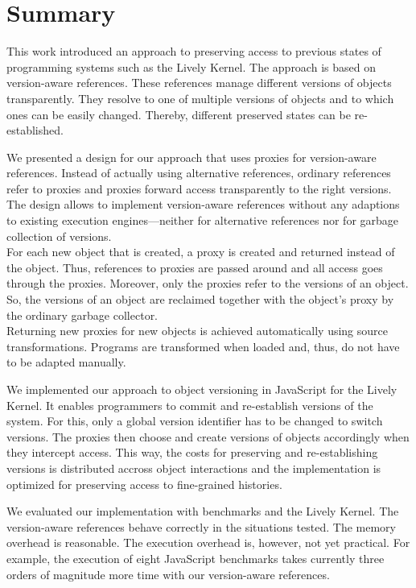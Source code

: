 \chapter{Summary} \label{chapter:SUMMARY}

This work introduced an approach to preserving access to previous states of programming systems such as the Lively Kernel.
The approach is based on version-aware references.
These references manage different versions of objects transparently.
They resolve to one of multiple versions of objects and to which ones can be easily changed.
Thereby, different preserved states can be re-established.

We presented a design for our approach that uses proxies for version-aware references.
Instead of actually using alternative references, ordinary references refer to proxies and proxies forward access transparently to the right versions.
The design allows to implement version-aware references without any adaptions to existing execution engines---neither for alternative references nor for garbage collection of versions.\\
For each new object that is created, a proxy is created and returned instead of the object.
Thus, references to proxies are passed around and all access goes through the proxies.
Moreover, only the proxies refer to the versions of an object.
So, the versions of an object are reclaimed together with the object's proxy by the ordinary garbage collector.\\
Returning new proxies for new objects is achieved automatically using source transformations.
Programs are transformed when loaded and, thus, do not have to be adapted manually.

We implemented our approach to object versioning in JavaScript for the Lively Kernel.
It enables programmers to commit and re-establish versions of the system.
For this, only a global version identifier has to be changed to switch versions.
The proxies then choose and create versions of objects accordingly when they intercept access.
This way, the costs for preserving and re-establishing versions is distributed accross object interactions and the implementation is optimized for preserving access to fine-grained histories.

We evaluated our implementation with benchmarks and the Lively Kernel.
The version-aware references behave correctly in the situations tested.
The memory overhead is reasonable.
The execution overhead is, however, not yet practical.
For example, the execution of eight JavaScript benchmarks takes currently three orders of magnitude more time with our version-aware references.

